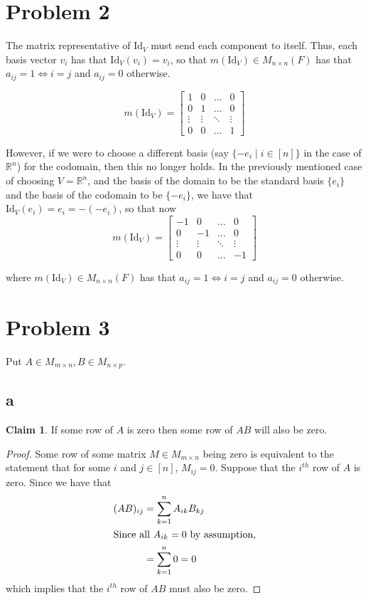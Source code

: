 \documentclass[12pt,letterpaper]{article}
\theoremstyle{definition}
\newtheorem*{claim}{Claim}
\newcommand{\R}{\mathbb{R}}
\newcommand{\id}{\mathrm{Id}}
\begin{document}
\section*{Problem 2}

The matrix representative of $\id_V$ must send each component to itself. Thus,
each basis vector $v_i$ has that $\id_V(v_i) = v_i$, so that $m(\id_V) \in M_{n
  \times n}(F)$ has that $a_{ij} = 1 \iff i = j$ and $a_{ij} = 0$ otherwise.

\[
  m(\id_V) = \begin{bmatrix}
    1 & 0 & \dots & 0 \\
    0 & 1 & \dots & 0 \\
    \vdots & \vdots & \ddots & \vdots \\
    0 & 0 & \dots & 1
  \end{bmatrix}
\]

However, if we were to choose a different basis (say $\{-e_i \mid i \in [n]\}$
in the case of $\R^n$) for the codomain, then this no longer holds. In the
previously mentioned case of choosing $V = \R^n$, and the basis of the domain to
be the standard basis $\{e_i\}$ and the basis of the codomain to be $\{-e_i\}$,
we have that $\id_V(e_i) = e_i = -(-e_i)$, so that now
\[
  m(\id_V) = \begin{bmatrix}
    -1 & 0 & \dots & 0 \\
    0 & -1 & \dots & 0 \\
    \vdots & \vdots & \ddots & \vdots \\
    0 & 0 & \dots & -1
  \end{bmatrix}
\]

where $m(\id_V) \in M_{n\times n}(F)$ has that $a_{ij} = 1 \iff i = j$ and
$a_{ij} = 0$ otherwise.

\section*{Problem 3}

Put $A \in M_{m \times n}, B \in M_{n \times p}$.

\subsection*{a}

\begin{claim}
  If some row of $A$ is zero then some row of $AB$ will also be zero.
\end{claim}

\begin{proof}
  Some row of some matrix $M \in M_{m \times n}$ being zero is equivalent to the statement that for some $i$
  and $j \in [n]$, $M_{ij} = 0$. Suppose that the $i^{th}$ row of $A$ is zero.
  Since we have that
  \begin{align*}
    (AB)_{ij} &= \sum_{k=1}^nA_{ik}B_{kj} \\
    \intertext{Since all $A_{ik} = 0$ by assumption,}
              &= \sum_{k=1}^n0 = 0
  \end{align*}
  which implies that the $i^{th}$ row of $AB$ must also be zero.
\end{proof}
\end{document}
